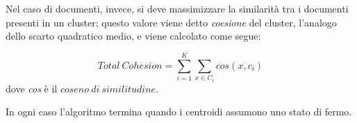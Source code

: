 Nel caso di documenti, invece, si deve massimizzare la similarità tra i documenti presenti in un cluster; questo valore viene detto \emph{coesione} del cluster, l'analogo dello scarto quadratico medio, e viene calcolato come segue:

\begin{equation*}
	Total\ Cohesion = \sum_{i=1}^{K}{\sum_{x \in C_i} {cos(x, c_i)}}
\end{equation*}
dove \emph{cos} è il $coseno\ di\ similitudine$.

In ogni caso l'algoritmo termina quando i centroidi assumono uno stato di fermo\cite{k-means}. 
